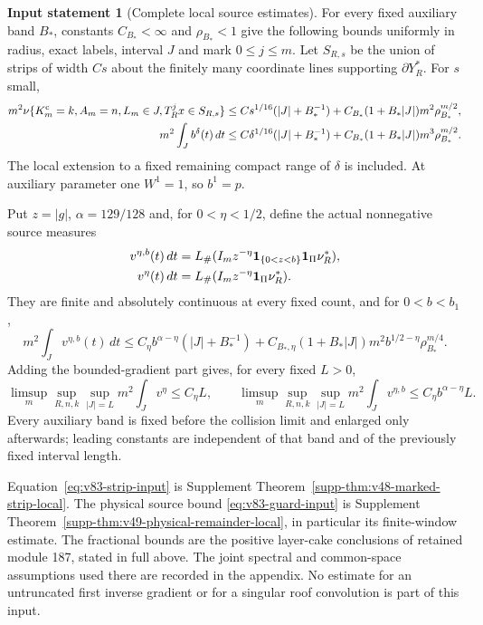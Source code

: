\documentclass[11pt,reqno]{amsart}
\numberwithin{equation}{section}
\theoremstyle{definition}\newtheorem{definition}[theorem]{Definition}
\theoremstyle{remark}\newtheorem{remark}[theorem]{Remark}
\theoremstyle{definition}\newtheorem{inputstatement}[theorem]{Input statement}
\begin{document}
\begin{inputstatement}[Complete local source estimates]
\label{input:v83-local}
For every fixed auxiliary band $B_*$, constants $C_{B_*}<\infty$ and
$\rho_{B_*}<1$ give the following bounds uniformly in radius, exact
labels, interval $J$ and mark $0\le j\le m$. Let $S_{R,s}$ be the
union of strips of width $Cs$ about the finitely many coordinate lines
supporting $\partial Y_R^*$. For $s$ small,
\begin{align}
 m^2\nu\{K_m^{\rm c}=k,A_m=n,L_m\in J,
                       T_R^jx\in S_{R,s}\}
 &\le Cs^{1/16}(|J|+B_*^{-1})
   +C_{B_*}(1+B_*|J|)m^2\rho_{B_*}^{m/2},\label{eq:v83-strip-input}\\
 m^2\int_Jb^\delta(t)\,dt
 &\le C\delta^{1/16}(|J|+B_*^{-1})
   +C_{B_*}(1+B_*|J|)m^3\rho_{B_*}^{m/2}.\label{eq:v83-guard-input}
\end{align}
The local extension to a fixed remaining compact range of $\delta$
is included. At auxiliary parameter one $W^1=1$, so $b^1=p$.

Put $z=|g|$, $\alpha=129/128$ and, for $0<\eta<1/2$, define the
actual nonnegative source measures
\begin{align}
 v^{\eta,b}(t)\,dt&=L_\#(I_m z^{-\eta}\one_{\{0<z<b\}}
                                       \one_\Pi\nu_R^*),\notag\\
 v^\eta(t)\,dt&=L_\#(I_m z^{-\eta}\one_\Pi\nu_R^*).
                                                   \label{eq:v83-fractional-input}
\end{align}
They are finite and absolutely continuous at every fixed count, and
for $0<b<b_1$,
\begin{equation}\label{eq:v83-fractional-finite-input}
 m^2\int_Jv^{\eta,b}(t)\,dt
 \le C_\eta b^{\alpha-\eta}(|J|+B_*^{-1})
  +C_{B_*,\eta}(1+B_*|J|)m^2b^{1/2-\eta}\rho_{B_*}^{m/4}.
\end{equation}
Adding the bounded-gradient part gives, for every fixed $L>0$,
\begin{equation}\label{eq:v83-fixed-width-input}
 \limsup_m\sup_{R,n,k}\sup_{|J|=L}m^2\int_Jv^\eta\le C_\eta L,
 \qquad
 \limsup_m\sup_{R,n,k}\sup_{|J|=L}m^2\int_Jv^{\eta,b}
                                      \le C_\eta b^{\alpha-\eta}L.
\end{equation}
Every auxiliary band is fixed before the collision limit and enlarged
only afterwards; leading constants are independent of that band and
of the previously fixed interval length.
\end{inputstatement}
Equation~\eqref{eq:v83-strip-input} is Supplement
Theorem~\ref{supp-thm:v48-marked-strip-local}. The physical source
bound \eqref{eq:v83-guard-input} is Supplement
Theorem~\ref{supp-thm:v49-physical-remainder-local}, in particular its
finite-window estimate. The fractional bounds are the positive
layer-cake conclusions of retained module 187, stated in full above.
The joint spectral and common-space assumptions used there are recorded
in the appendix. No estimate for an untruncated first inverse gradient
or for a singular roof convolution is part of this input.
\end{document}
